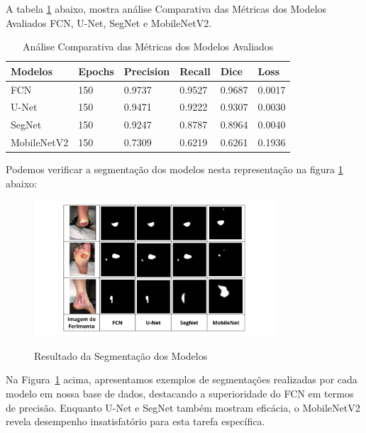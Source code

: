 \clearpage

A tabela \ref{tab:analiseMetricas} abaixo, mostra análise Comparativa das Métricas dos Modelos Avaliados \ac{FCN}, \ac{U-Net}, \ac{SegNet} e \ac{MobileNetV2}.  

\begin{table}[htbp]
    \centering
    \caption{Análise Comparativa das Métricas dos Modelos Avaliados}
    \begin{tabular}{|l|l|l|l|l|l|}
        \hline
        Modelos           & Epochs & Precision & Recall  & Dice    & Loss    \\ \hline
        \ac{FCN}          & 150    & 0.9737    & 0.9527  & 0.9687  & 0.0017  \\ \hline
        \ac{U-Net}        & 150    & 0.9471    & 0.9222  & 0.9307  & 0.0030  \\ \hline
        \ac{SegNet}       & 150    & 0.9247    & 0.8787  & 0.8964  & 0.0040  \\ \hline
        \ac{MobileNetV2}  & 150    & 0.7309    & 0.6219  & 0.6261  & 0.1936  \\ \hline
    \end{tabular}
    \label{tab:analiseMetricas}
\end{table}

Podemos verificar a segmentação dos modelos nesta representação na figura \ref{fig:resultSegmetationModels} abaixo:

\begin{figure}[htbp]
    \centering
    \caption{Resultado da Segmentação dos Modelos}
    \includegraphics[width=0.8\textwidth]{img/resultado_segmentacao_modelos.png}
    \label{fig:resultSegmetationModels}
\end{figure}

Na Figura~\ref{fig:resultSegmetationModels} acima, apresentamos exemplos de segmentações realizadas por cada modelo em nossa base de dados, destacando a superioridade do \ac{FCN} em termos de precisão. Enquanto \ac{U-Net} e \ac{SegNet} também mostram eficácia, o \ac{MobileNetV2} revela desempenho insatisfatório para esta tarefa específica.

